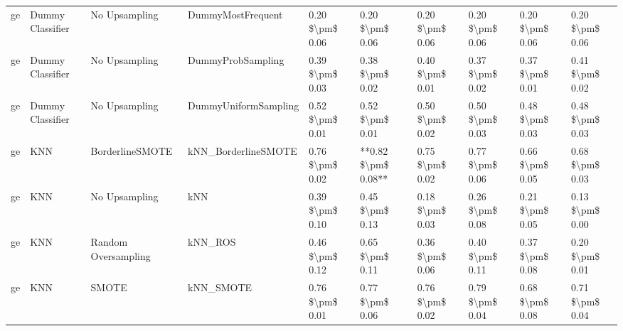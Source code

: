 \begin{tabular}{llllllllll}
      ge &                Dummy Classifier &                 No Upsampling &                            DummyMostFrequent &     0.20 \$\textbackslash pm\$ 0.06 &           0.20 \$\textbackslash pm\$ 0.06 &       0.20 \$\textbackslash pm\$ 0.06 &        0.20 \$\textbackslash pm\$ 0.06 &                         0.20 \$\textbackslash pm\$ 0.06 &     0.20 \$\textbackslash pm\$ 0.06 \\
      ge &                Dummy Classifier &                 No Upsampling &                            DummyProbSampling &     0.39 \$\textbackslash pm\$ 0.03 &           0.38 \$\textbackslash pm\$ 0.02 &       0.40 \$\textbackslash pm\$ 0.01 &        0.37 \$\textbackslash pm\$ 0.02 &                         0.37 \$\textbackslash pm\$ 0.01 &     0.41 \$\textbackslash pm\$ 0.02 \\
      ge &                Dummy Classifier &                 No Upsampling &                         DummyUniformSampling &     0.52 \$\textbackslash pm\$ 0.01 &           0.52 \$\textbackslash pm\$ 0.01 &       0.50 \$\textbackslash pm\$ 0.02 &        0.50 \$\textbackslash pm\$ 0.03 &                         0.48 \$\textbackslash pm\$ 0.03 &     0.48 \$\textbackslash pm\$ 0.03 \\
      ge &                             KNN &               BorderlineSMOTE &                          kNN\_BorderlineSMOTE &     0.76 \$\textbackslash pm\$ 0.02 &       **0.82 \$\textbackslash pm\$ 0.08** &       0.75 \$\textbackslash pm\$ 0.02 &        0.77 \$\textbackslash pm\$ 0.06 &                         0.66 \$\textbackslash pm\$ 0.05 &     0.68 \$\textbackslash pm\$ 0.03 \\
      ge &                             KNN &                 No Upsampling &                                          kNN &     0.39 \$\textbackslash pm\$ 0.10 &           0.45 \$\textbackslash pm\$ 0.13 &       0.18 \$\textbackslash pm\$ 0.03 &        0.26 \$\textbackslash pm\$ 0.08 &                         0.21 \$\textbackslash pm\$ 0.05 &     0.13 \$\textbackslash pm\$ 0.00 \\
      ge &                             KNN &           Random Oversampling &                                      kNN\_ROS &     0.46 \$\textbackslash pm\$ 0.12 &           0.65 \$\textbackslash pm\$ 0.11 &       0.36 \$\textbackslash pm\$ 0.06 &        0.40 \$\textbackslash pm\$ 0.11 &                         0.37 \$\textbackslash pm\$ 0.08 &     0.20 \$\textbackslash pm\$ 0.01 \\
      ge &                             KNN &                         SMOTE &                                    kNN\_SMOTE &     0.76 \$\textbackslash pm\$ 0.01 &           0.77 \$\textbackslash pm\$ 0.06 &       0.76 \$\textbackslash pm\$ 0.02 &        0.79 \$\textbackslash pm\$ 0.04 &                         0.68 \$\textbackslash pm\$ 0.08 &     0.71 \$\textbackslash pm\$ 0.04 \\

\end{tabular}
